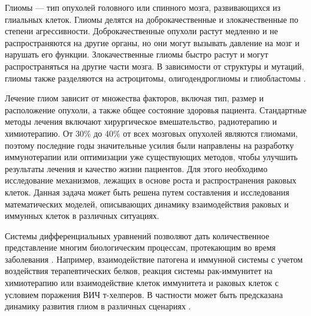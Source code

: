 \documentclass[12pt,a4paper]{extarticle}
\theoremstyle{definition}
\theoremstyle{definition}
\theoremstyle{definition}
\begin{document}
	\begin{introduction}
	
	Глиомы --- тип опухолей головного или спинного мозга, развивающихся из глиальных клеток. Глиомы делятся на доброкачественные и злокачественные по степени агрессивности.  Доброкачественные опухоли растут медленно и не распространяются на другие органы, но они могут вызывать давление на мозг и нарушать его функции. Злокачественные глиомы быстро растут и могут распространяться на другие части мозга. В зависимости от структуры и мутаций, глиомы также разделяются на астроцитомы, олигодендроглиомы и глиобластомы \cite{glioma_classification}.
	
	Лечение глиом зависит от множества факторов, включая тип, размер и расположение опухоли, а также общее состояние здоровья пациента. Стандартные методы лечения включают хирургическое вмешательство, радиотерапию и химиотерапию. От 30\% до 40\% от всех мозговых опухолей \cite{glioma_overview} являются глиомами, поэтому последние годы значительные усилия были направлены на разработку иммунотерапии или оптимизации уже существующих методов, чтобы улучшить результаты лечения и качество жизни пациентов. Для этого необходимо исследование механизмов, лежащих в основе роста и распространения раковых клеток. Данная задача может быть решена путем составления и исследования математических моделей, описывающих динамику взаимодействия раковых и иммунных клеток в различных ситуациях. 
	
	Системы дифференциальных уравнений позволяют дать количественное представление многим биологическим процессам, протекающим во время заболевания \cite{abt_DEs}. Например, взаимодействие патогена и иммунной системы с учетом воздействия терапевтических белков\cite{Kasbawati et.al.}, реакция системы рак-иммунитет на химиотерапию\cite{W. L. Duan et.al.,Xiangdong Liu et.al.,L.G. de Pillis et.al., dePillis L.G. et.al.} или взаимодействие клеток иммунитета и раковых клеток с условием поражения ВИЧ т-хелперов\cite{F. A. Rihan et.al.}. В частности может быть предсказана динамику развития глиом в различных сценариях \cite{gliomae_scenarios}.
	

\end{introduction}
\end{document}
